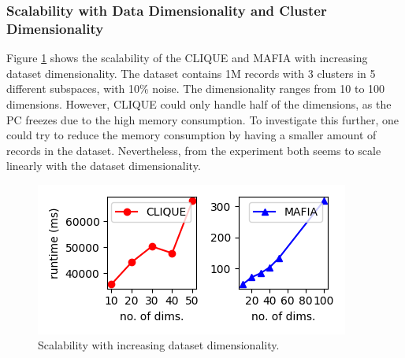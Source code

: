 \subsubsection{Scalability with Data Dimensionality and Cluster Dimensionality}
Figure \ref{fig:data_dimensionality_vs_runtime} shows the scalability of the CLIQUE and MAFIA with increasing dataset dimensionality. The dataset contains 1M records with 3 clusters in 5 different subspaces, with 10\% noise. The dimensionality ranges from 10 to 100 dimensions. However, CLIQUE could only handle half of the dimensions, as the PC freezes due to the high memory consumption. To investigate this further, one could try to reduce the memory consumption by having a smaller amount of records in the dataset. Nevertheless, from the experiment both seems to scale linearly with the dataset dimensionality.
\begin{figure}[H]
    \vspace*{-0.6cm}
    \centering
    \includegraphics[scale=0.5]{figures/data_dimensionality_vs_runtime.png}
    \caption{Scalability with increasing dataset dimensionality.}
    \label{fig:data_dimensionality_vs_runtime}
    \vspace*{-0.6cm}
\end{figure}

